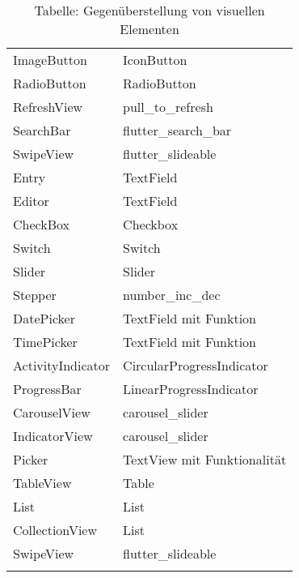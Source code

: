 \begin{xltabular}{\textwidth}{X|X}
	ImageButton		       			&  		IconButton 		\\ 
	RadioButton		       			&  		RadioButton 		\\ 
	RefreshView		       			&  		pull\_to\_refresh 		\\ 
	SearchBar		       				&  		flutter\_search\_bar 	\\ 
	SwipeView		       			&  		flutter\_slideable 		\\ 
	Entry		       						&  		TextField	 		\\ 
	Editor		       					&  		TextField	 		\\ 
	CheckBox		       				&  		Checkbox	 		\\ 
	Switch		       					&  		Switch	 		\\ 
	Slider		       					&  		Slider	 		\\ 
	Stepper		       				&  		number\_inc\_dec	 		\\ 
	DatePicker		       			&  		TextField mit Funktion		\\ 
	TimePicker		       			&  		TextField mit Funktion	 		\\ 
	ActivityIndicator		       	&  		CircularProgressIndicator 		\\ 
	ProgressBar		       			&  		LinearProgressIndicator 		\\ 
	CarouselView		       		&  		carousel\_slider  		\\ 
	IndicatorView		       		&  		carousel\_slider			\\ 	
	Picker		       					&  		TextView mit Funktionalität 		\\ 
	TableView		       				&  		Table		\\ 
	List		       						&  		List 		\\ 
	CollectionView		       		&  		List 		\\ 
	SwipeView		       			&  		flutter\_slideable 		\\ 	
	  \caption*{Tabelle: Gegenüberstellung von visuellen Elementen}
 \label{tab:ComapreXFFlutter}
\end{xltabular}
